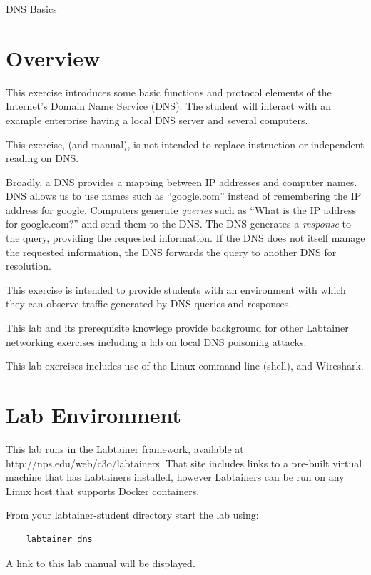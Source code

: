 


\begin{center}
{\LARGE DNS Basics}
\vspace{0.1in}\\
\end{center}

\section{Overview}
This exercise introduces some basic functions and protocol elements of the Internet's
Domain Name Service (DNS).  The student will interact with an example enterprise having a local 
DNS server and several computers.

This exercise, (and manual), is not intended to replace instruction
or independent reading on DNS.

Broadly, a DNS provides a mapping between IP addresses and computer names.  DNS allows us to use
names such as ``google.com'' instead of remembering the IP address for google.  Computers generate
\textit{queries} such as ``What is the IP address for google.com?'' and send them to the DNS.  The DNS
generates a \textit{response} to the query, providing the requested information.  If the DNS does not itself
manage the requested information, the DNS forwards the query to another DNS for resolution.

This exercise is intended to provide
students with an environment with which they can observe 
traffic generated by DNS queries and responses.

This lab and its prerequisite knowlege provide background for other Labtainer networking exercises 
including a lab on local DNS poisoning attacks.

This lab exercises includes use of the Linux command line (shell), and Wireshark.

\section{Lab Environment}
This lab runs in the Labtainer framework,
available at http://nps.edu/web/c3o/labtainers.
That site includes links to a pre-built virtual machine
that has Labtainers installed, however Labtainers can
be run on any Linux host that supports Docker containers.

From your labtainer-student directory start the lab using:
\begin{verbatim}
    labtainer dns
\end{verbatim}
\noindent A link to this lab manual will be displayed.  


